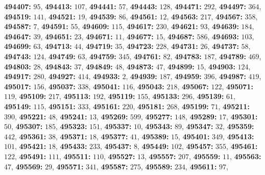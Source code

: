 \textsf{\bfseries 494407:} $95$, \textsf{\bfseries 494413:} $107$, \textsf{\bfseries 494441:} $57$, \textsf{\bfseries 494443:} $128$, \textsf{\bfseries 494471:} $292$, \textsf{\bfseries 494497:} $364$, \textsf{\bfseries 494519:} $141$, \textsf{\bfseries 494521:} $19$, \textsf{\bfseries 494539:} $86$, \textsf{\bfseries 494561:} $12$, \textsf{\bfseries 494563:} $217$, \textsf{\bfseries 494567:} $358$, \textsf{\bfseries 494587:} $7$, \textsf{\bfseries 494591:} $55$, \textsf{\bfseries 494609:} $115$, \textsf{\bfseries 494617:} $230$, \textsf{\bfseries 494621:} $93$, \textsf{\bfseries 494639:} $184$, \textsf{\bfseries 494647:} $39$, \textsf{\bfseries 494651:} $23$, \textsf{\bfseries 494671:} $11$, \textsf{\bfseries 494677:} $15$, \textsf{\bfseries 494687:} $586$, \textsf{\bfseries 494693:} $103$, \textsf{\bfseries 494699:} $63$, \textsf{\bfseries 494713:} $44$, \textsf{\bfseries 494719:} $35$, \textsf{\bfseries 494723:} $228$, \textsf{\bfseries 494731:} $26$, \textsf{\bfseries 494737:} $58$, \textsf{\bfseries 494743:} $124$, \textsf{\bfseries 494749:} $63$, \textsf{\bfseries 494759:} $345$, \textsf{\bfseries 494761:} $82$, \textsf{\bfseries 494783:} $187$, \textsf{\bfseries 494789:} $469$, \textsf{\bfseries 494803:} $28$, \textsf{\bfseries 494843:} $37$, \textsf{\bfseries 494849:} $48$, \textsf{\bfseries 494873:} $47$, \textsf{\bfseries 494899:} $15$, \textsf{\bfseries 494903:} $124$, \textsf{\bfseries 494917:} $280$, \textsf{\bfseries 494927:} $414$, \textsf{\bfseries 494933:} $2$, \textsf{\bfseries 494939:} $187$, \textsf{\bfseries 494959:} $396$, \textsf{\bfseries 494987:} $419$, \textsf{\bfseries 495017:} $156$, \textsf{\bfseries 495037:} $338$, \textsf{\bfseries 495041:} $116$, \textsf{\bfseries 495043:} $218$, \textsf{\bfseries 495067:} $122$, \textsf{\bfseries 495071:} $119$, \textsf{\bfseries 495109:} $217$, \textsf{\bfseries 495113:} $192$, \textsf{\bfseries 495119:} $155$, \textsf{\bfseries 495133:} $296$, \textsf{\bfseries 495139:} $61$, \textsf{\bfseries 495149:} $115$, \textsf{\bfseries 495151:} $333$, \textsf{\bfseries 495161:} $220$, \textsf{\bfseries 495181:} $268$, \textsf{\bfseries 495199:} $71$, \textsf{\bfseries 495211:} $390$, \textsf{\bfseries 495221:} $48$, \textsf{\bfseries 495241:} $13$, \textsf{\bfseries 495269:} $599$, \textsf{\bfseries 495277:} $148$, \textsf{\bfseries 495289:} $17$, \textsf{\bfseries 495301:} $50$, \textsf{\bfseries 495307:} $185$, \textsf{\bfseries 495323:} $151$, \textsf{\bfseries 495337:} $10$, \textsf{\bfseries 495343:} $89$, \textsf{\bfseries 495347:} $32$, \textsf{\bfseries 495359:} $442$, \textsf{\bfseries 495361:} $38$, \textsf{\bfseries 495371:} $18$, \textsf{\bfseries 495377:} $41$, \textsf{\bfseries 495389:} $15$, \textsf{\bfseries 495401:} $349$, \textsf{\bfseries 495413:} $101$, \textsf{\bfseries 495421:} $18$, \textsf{\bfseries 495433:} $233$, \textsf{\bfseries 495437:} $8$, \textsf{\bfseries 495449:} $102$, \textsf{\bfseries 495457:} $355$, \textsf{\bfseries 495461:} $122$, \textsf{\bfseries 495491:} $111$, \textsf{\bfseries 495511:} $110$, \textsf{\bfseries 495527:} $13$, \textsf{\bfseries 495557:} $207$, \textsf{\bfseries 495559:} $11$, \textsf{\bfseries 495563:} $47$, \textsf{\bfseries 495569:} $29$, \textsf{\bfseries 495571:} $341$, \textsf{\bfseries 495587:} $275$, \textsf{\bfseries 495589:} $234$, \textsf{\bfseries 495611:} $97$, 
